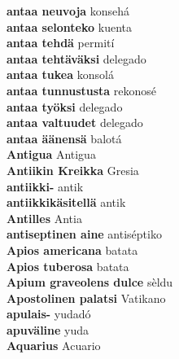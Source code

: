 \textbf{ antaa neuvoja  } konsehá \\
\textbf{ antaa selonteko  } kuenta \\
\textbf{ antaa tehdä  } permití \\
\textbf{ antaa tehtäväksi  } delegado \\
\textbf{ antaa tukea  } konsolá \\
\textbf{ antaa tunnustusta  } rekonosé \\
\textbf{ antaa työksi  } delegado \\
\textbf{ antaa valtuudet  } delegado \\
\textbf{ antaa äänensä  } balotá \\
\textbf{ Antigua  } Antigua \\
\textbf{ Antiikin Kreikka  } Gresia \\
\textbf{ antiikki-  } antik \\
\textbf{ antiikkikäsitellä  } antik \\
\textbf{ Antilles  } Antia \\
\textbf{ antiseptinen aine  } antiséptiko \\
\textbf{ Apios americana  } batata \\
\textbf{ Apios tuberosa  } batata \\
\textbf{ Apium graveolens dulce  } sèldu \\
\textbf{ Apostolinen palatsi  } Vatikano \\
\textbf{ apulais-  } yudadó \\
\textbf{ apuväline  } yuda \\
\textbf{ Aquarius  } Acuario \\

